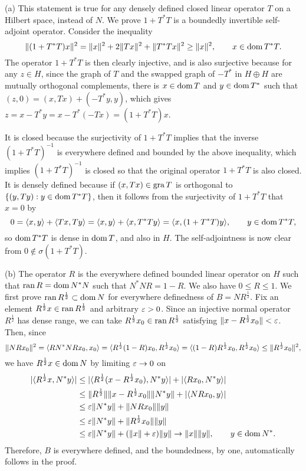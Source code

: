 \documentclass{../../large}
\begin{document}
\begin{pf}
(a)
This statement is true for any densely defined closed linear operator $T$ on a Hilbert space, instead of $N$.
We prove $1+T^*T$ is a boundedly invertible self-adjoint operator.
Consider the inequality
\[\|(1+T^*T)x\|^2=\|x\|^2+2\|Tx\|^2+\|T^*Tx\|^2\ge\|x\|^2,\qquad x\in\operatorname{dom} T^*T.\]
The operator $1+T^*T$ is then clearly injective, and is also surjective because for any $z\in H$, since the graph of $T$ and the swapped graph of $-T^*$ in $H\oplus H$ are mutually orthogonal complements, there is $x\in\operatorname{dom} T$ and $y\in\operatorname{dom} T^*$ such that $(z,0)=(x,Tx)+(-T^*y,y)$, which gives $z=x-T^*y=x-T^*(-Tx)=(1+T^*T)x$.

It is closed because the surjectivity of $1+T^*T$ implies that the inverse $(1+T^*T)^{-1}$ is everywhere defined and bounded by the above inequality, which implies $(1+T^*T)^{-1}$ is closed so that the original operator $1+T^*T$ is also closed.
It is densely defined because if $(x,Tx)\in\operatorname{gra} T$ is orthogonal to $\{(y,Ty):y\in\operatorname{dom} T^*T\}$, then it follows from the surjectivity of $1+T^*T$ that $x=0$ by
\[0=\langle x,y\rangle+\langle Tx,Ty\rangle=\langle x,y\rangle+\langle x,T^*Ty\rangle=\langle x,(1+T^*T)y\rangle,\qquad y\in\operatorname{dom} T^*T,\]
so $\operatorname{dom} T^*T$ is dense in $\operatorname{dom} T$, and also in $H$.
The self-adjointness is now clear from $0\notin\sigma(1+T^*T)$.

(b)
The operator $R$ is the everywhere defined bounded linear operator on $H$ such that $\operatorname{ran} R=\operatorname{dom} N^*N$ such that $N^*NR=1-R$.
We also have $0\le R\le1$.
We first prove $\operatorname{ran} R^{\frac12}\subset\operatorname{dom} N$ for everywhere definedness of $B=NR^{\frac12}$.
Fix an element $R^{\frac12}x\in\operatorname{ran} R^{\frac12}$ and arbitrary $\varepsilon>0$.
Since an injective normal operator $R^{\frac12}$ has dense range, we can take $R^{\frac12}x_0\in\operatorname{ran} R^{\frac12}$ satisfying $\|x-R^{\frac12}x_0\|<\varepsilon$.
Then, since
\[\|NRx_0\|^2
=\langle RN^*NRx_0,x_0\rangle
=\langle R^{\frac12}(1-R)x_0,R^{\frac12}x_0\rangle
=\langle(1-R)R^{\frac12}x_0,R^{\frac12}x_0\rangle
\le\|R^{\frac12}x_0\|^2,\]
we have $R^{\frac12}x\in\operatorname{dom} N$ by limiting $\varepsilon\to0$ on
\begin{align*}
|\langle R^{\frac12}x,N^*y\rangle|
&\le|\langle R^{\frac12}(x-R^{\frac12}x_0),N^*y\rangle|+|\langle Rx_0,N^*y\rangle|\\
&\le\|R^{\frac12}\|\|x-R^{\frac12}x_0\|\|N^*y\|+|\langle NRx_0,y\rangle|\\
&\le\varepsilon\|N^*y\|+\|NRx_0\|\|y\|\\
&\le\varepsilon\|N^*y\|+\|R^{\frac12}x_0\|\|y\|\\
&\le\varepsilon\|N^*y\|+(\|x\|+\varepsilon)\|y\|\to\|x\|\|y\|,\qquad y\in\operatorname{dom} N^*.
\end{align*}
Therefore, $B$ is everywhere defined, and the boundedness, by one, automatically follows in the proof.


\end{pf}
\end{document}
